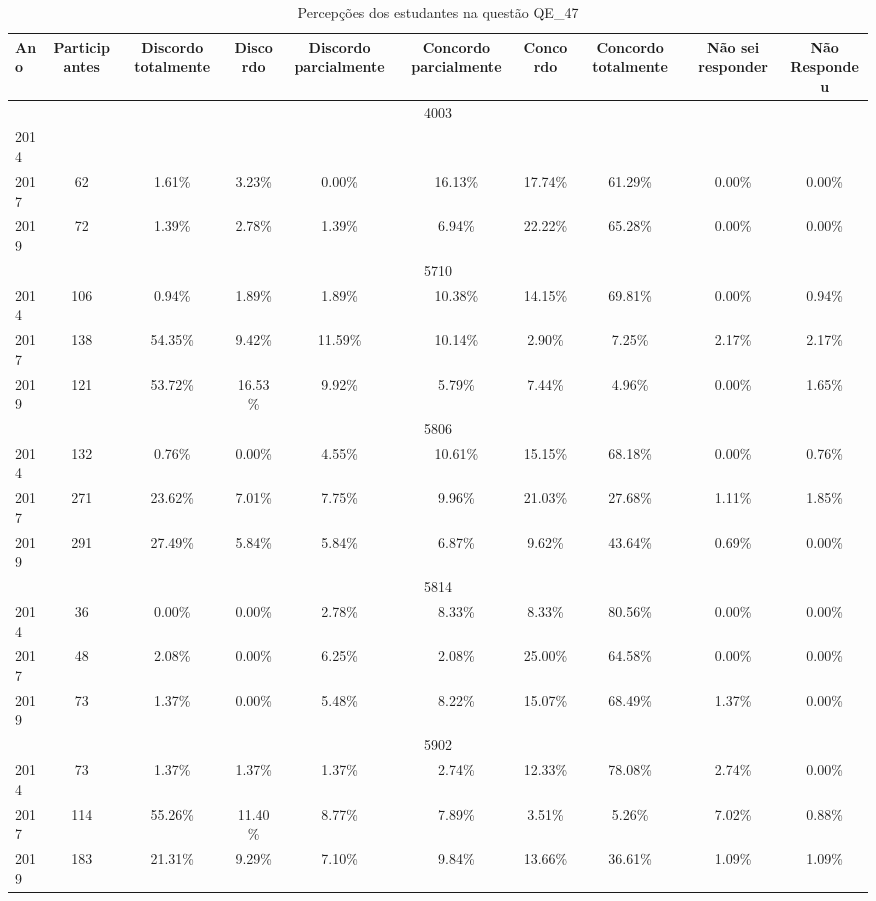 \begin{table}[H]
\centering
\caption{Percepções dos estudantes na questão QE\_47}
\begin{tabular}{|l|c|ccc|ccc|cc|}
\hline
\toprule
Ano & Participantes & Discordo totalmente & Discordo & Discordo parcialmente & Concordo parcialmente & Concordo & Concordo totalmente & Não sei responder & Não Respondeu \\
\midrule
\hline
\multicolumn{10}{|c|}{4003}\\
\hline
2014 & & & & & & & & & \\
2017 & 62 & 1.61\% & 3.23\% & 0.00\% & 16.13\% & 17.74\% & 61.29\% & 0.00\% & 0.00\%\\
2019 & 72 & 1.39\% & 2.78\% & 1.39\% & 6.94\% & 22.22\% & 65.28\% & 0.00\% & 0.00\%\\
\hline
\hline
\multicolumn{10}{|c|}{5710}\\
\hline
2014 & 106 & 0.94\% & 1.89\% & 1.89\% & 10.38\% & 14.15\% & 69.81\% & 0.00\% & 0.94\%\\
2017 & 138 & 54.35\% & 9.42\% & 11.59\% & 10.14\% & 2.90\% & 7.25\% & 2.17\% & 2.17\%\\
2019 & 121 & 53.72\% & 16.53\% & 9.92\% & 5.79\% & 7.44\% & 4.96\% & 0.00\% & 1.65\%\\
\hline
\hline
\multicolumn{10}{|c|}{5806}\\
\hline
2014 & 132 & 0.76\% & 0.00\% & 4.55\% & 10.61\% & 15.15\% & 68.18\% & 0.00\% & 0.76\%\\
2017 & 271 & 23.62\% & 7.01\% & 7.75\% & 9.96\% & 21.03\% & 27.68\% & 1.11\% & 1.85\%\\
2019 & 291 & 27.49\% & 5.84\% & 5.84\% & 6.87\% & 9.62\% & 43.64\% & 0.69\% & 0.00\%\\
\hline
\hline
\multicolumn{10}{|c|}{5814}\\
\hline
2014 & 36 & 0.00\% & 0.00\% & 2.78\% & 8.33\% & 8.33\% & 80.56\% & 0.00\% & 0.00\%\\
2017 & 48 & 2.08\% & 0.00\% & 6.25\% & 2.08\% & 25.00\% & 64.58\% & 0.00\% & 0.00\%\\
2019 & 73 & 1.37\% & 0.00\% & 5.48\% & 8.22\% & 15.07\% & 68.49\% & 1.37\% & 0.00\%\\
\hline
\hline
\multicolumn{10}{|c|}{5902}\\
\hline
2014 & 73 & 1.37\% & 1.37\% & 1.37\% & 2.74\% & 12.33\% & 78.08\% & 2.74\% & 0.00\%\\
2017 & 114 & 55.26\% & 11.40\% & 8.77\% & 7.89\% & 3.51\% & 5.26\% & 7.02\% & 0.88\%\\
2019 & 183 & 21.31\% & 9.29\% & 7.10\% & 9.84\% & 13.66\% & 36.61\% & 1.09\% & 1.09\%\\

\end{tabular}
\end{table}
